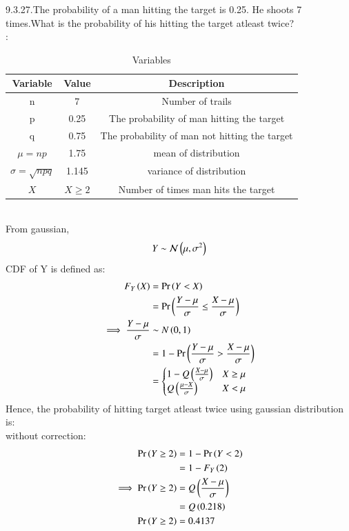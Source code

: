 \documentclass[journal,12pt,twocolumn]{IEEEtran}
\theoremstyle{remark}
\begin{document}
\renewcommand{\thefigure}{\theenumi}
\renewcommand{\thetable}{\theenumi}
9.3.27.The probability of a man hitting the target is 0.25. He shoots 7 times.What is the probability of his hitting the target atleast twice?
\fi
\\ \solution:
\begin{table}[ht]
    \centering
    \caption{Variables}
    \label{table:gaussian/9/3/27/}
\begin{tabular}{|c|c|c|}
\hline
Variable & Value & Description \\
\hline
n & 7 & Number of trails\\
\hline
p & 0.25 & The probability of man hitting the target\\
\hline
q & 0.75 & The probability of man not hitting the target\\
\hline
$\mu=np$ & 1.75 & mean of distribution\\
\hline
$\sigma=\sqrt{npq}$ & 1.145 & variance of distribution\\
\hline
$X$ & $ X \ge 2 $ & Number of times man hits the target \\
\hline
\end{tabular} 
\end{table}\\
From gaussian,
\begin{align}
Y \sim \mathcal{N}\left(\mu,\sigma^{2}\right)
\end{align}
CDF of Y is defined as:
\begin{align}
	F_Y\left(X\right)&=\Pr\left(Y<X\right)\\
	&=\Pr\left(\frac{Y-\mu}{\sigma}\le \frac{X-\mu}{\sigma}\right)\\
	\implies \frac{Y-\mu}{\sigma} &\sim N\left(0,1\right)\\
	&=1-\Pr\left(\frac{Y-\mu}{\sigma}>\frac{X-\mu}{\sigma}\right)\\
	&=\begin{cases}
		1-Q\left(\frac{X-\mu}{\sigma}\right) & X \geq \mu\\
		Q\left(\frac{\mu -X}{\sigma}\right) & X < \mu 
	\end{cases}
\end{align}
Hence, the probability of hitting target atleast twice using gaussian distribution is:\\
without correction:
\begin{align}
\Pr\left(Y \ge 2\right) &= 1-\Pr\left(Y < 2\right)\\
&= 1-F_Y\left(2\right)\\
\implies \Pr\left(Y \ge 2\right) &= Q\left(\frac{X-\mu}{\sigma}\right)\\
&= Q\left(0.218\right)\\
\Pr\left(Y \ge 2\right) &= 0.4137
\end{align}
\end{document}
